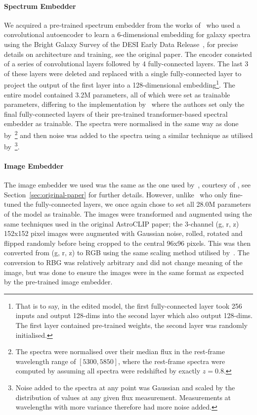 \paragraph{Spectrum Embedder} We acquired a pre-trained spectrum embedder from the works of~\cite{liang2023} who used
a convolutional autoencoder to learn a 6-dimensional embedding for galaxy spectra using the Bright Galaxy Survey of the
DESI Early Data Release~\citep{desiearly2023}, for precise details on architecture and training, see the original paper.
The encoder consisted of a series of convolutional layers followed by 4 fully-connected layers.
The last 3 of these layers were deleted and replaced with a single fully-connected layer to project the output of the first
layer into a 128-dimensional embedding\footnote{That is to say, in the edited model, the first fully-connected layer took
256 inputs and output 128-dims into the second layer which also output 128-dims.
The first layer contained pre-trained weights, the second layer was randomly initialised.}.
The entire model contained 3.2M parameters, all of which were set as trainable parameters, differing to the implementation
by~\cite{astroclip} where the authors set only the final fully-connected layers of their pre-trained transformer-based spectral
embedder as trainable.
The spectra were normalised in the same way as done by~\cite{liang2023}\footnote{The spectra were normalised over their median
flux in the rest-frame wavelength range of $[5300, 5850]$, where the rest-frame spectra were computed by assuming all
spectra were redshifted by exactly $z=0.8$.} and then noise was added to the spectra using a
similar technique as utilised by~\cite{astroclip}\footnote{Noise added to the spectra at any point was Gaussian and scaled
by the distribution of values at any given flux measurement.
Measurements at wavelengths with more variance therefore had more noise added.}.

\paragraph{Image Embedder} The image embedder we used was the same as the one used by~\cite{astroclip}, courtesy of
\cite{stein2021}, see Section~\eqref{sec:original-paper} for further details.
However, unlike~\cite{astroclip} who only fine-tuned the fully-connected layers, we once again chose to set all 28.0M parameters
of the model as trainable.
The images were transformed and augmented using the same techniques used in the original AstroCLIP paper; the 3-channel (g, r, z)
152x152 pixel images were augmented with Gaussian noise, rolled, rotated and flipped randomly before being cropped to the central
96x96 pixels.
This was then converted from (g, r, z) to RGB using the same scaling method utilised by~\cite{stein2021}.
The conversion to RBG was relatively arbitrary and did not change meaning of the image, but was done to ensure the images
were in the same format as expected by the pre-trained image embedder.

